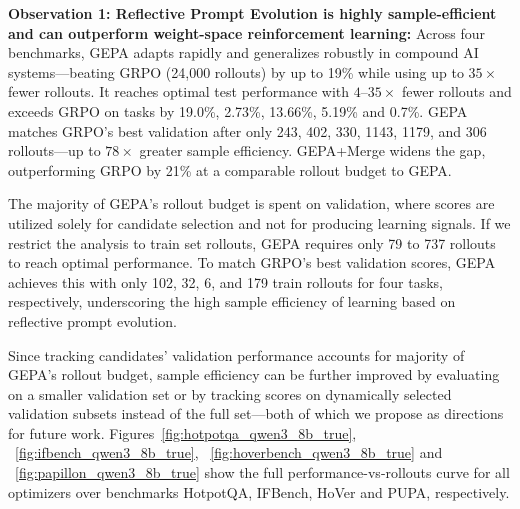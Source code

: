 \documentclass{article} %
\begin{document}
\textbf{Observation 1: Reflective Prompt Evolution is highly sample-efficient and can outperform weight-space reinforcement learning:}
Across four benchmarks, GEPA adapts rapidly and generalizes robustly in compound AI systems—beating GRPO (24,000 rollouts) by up to 19\% while using up to $35\times$ fewer rollouts. It reaches optimal test performance with $4$–$35\times$ fewer rollouts and exceeds GRPO on  tasks by 19.0\%, 2.73\%, 13.66\%, 5.19\% and 0.7\%. GEPA matches GRPO’s best validation after only 243, 402, 330, 1143, 1179, and 306 rollouts—up to $78\times$ greater sample efficiency. GEPA+Merge widens the gap, outperforming GRPO by 21\% at a comparable rollout budget to GEPA.

The majority of GEPA’s rollout budget is spent on validation, where scores are utilized solely for candidate selection and not for producing learning signals. If we restrict the analysis to train set rollouts, GEPA requires only 79 to 737 rollouts to reach optimal performance. To match GRPO’s best validation scores, GEPA achieves this with only 102, 32, 6, and 179 train rollouts for four tasks, respectively, underscoring the high sample efficiency of learning based on reflective prompt evolution.

Since tracking candidates' validation performance accounts for majority of GEPA's rollout budget, sample efficiency can be further improved by evaluating on a smaller validation set or by tracking scores on dynamically selected validation subsets instead of the full set—both of which we propose as directions for future work.
Figures~\ref{fig:hotpotqa_qwen3_8b_true}, ~\ref{fig:ifbench_qwen3_8b_true}, ~\ref{fig:hoverbench_qwen3_8b_true} and ~\ref{fig:papillon_qwen3_8b_true} show the full performance-vs-rollouts curve for all optimizers over benchmarks HotpotQA, IFBench, HoVer and PUPA, respectively.

\end{document}

